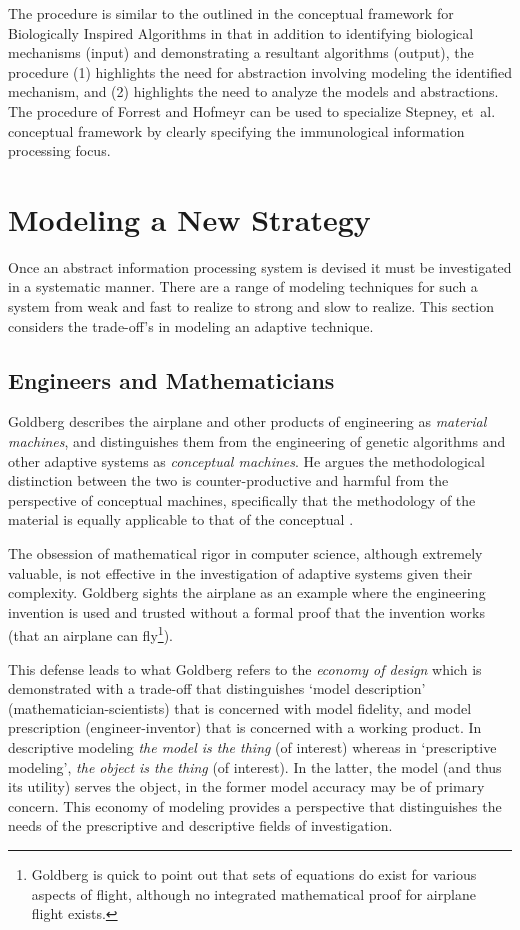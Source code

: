 \documentclass[a4paper, 11pt]{article}
\begin{document}
The procedure is similar to the outlined in the conceptual framework for Biologically Inspired Algorithms in that in addition to identifying biological mechanisms (input) and demonstrating a resultant algorithms (output), the procedure (1) highlights the need for abstraction involving modeling the identified mechanism, and (2) highlights the need to analyze the models and abstractions. The procedure of Forrest and Hofmeyr can be used to specialize Stepney, et~al. conceptual framework by clearly specifying the immunological information processing focus.


%
%
\section{Modeling a New Strategy}
\label{sub:engineers}
Once an abstract information processing system is devised it must be investigated in a systematic manner. There are a range of modeling techniques for such a system from weak and fast to realize to strong and slow to realize. This section considers the trade-off's in modeling an adaptive technique.

\subsection{Engineers and Mathematicians}
Goldberg describes the airplane and other products of engineering as \emph{material machines}, and distinguishes them from the engineering of genetic algorithms and other adaptive systems as \emph{conceptual machines}. He argues the methodological distinction between the two is counter-productive and harmful from the perspective of conceptual machines, specifically that the methodology of the material is equally applicable to that of the conceptual \cite{Goldberg1999a}. 

The obsession of mathematical rigor in computer science, although extremely valuable, is not effective in the investigation of adaptive systems given their complexity. Goldberg sights the airplane as an example where the engineering invention is used and trusted without a formal proof that the invention works (that an airplane can fly\footnote{Goldberg is quick to point out that sets of equations do exist for various aspects of flight, although no integrated mathematical proof for airplane flight exists.}). 

This defense leads to what Goldberg refers to the \emph{economy of design} which is demonstrated with a trade-off that distinguishes `model description' (mathematician-scientists) that is concerned with model fidelity, and model prescription (engineer-inventor) that is concerned with a working product. In descriptive modeling \emph{the model is the thing} (of interest) whereas in `prescriptive modeling', \emph{the object is the thing} (of interest). In the latter, the model (and thus its utility) serves the object, in the former model accuracy may be of primary concern. This economy of modeling provides a perspective that distinguishes the needs of the prescriptive and descriptive fields of investigation. 
\end{document}
